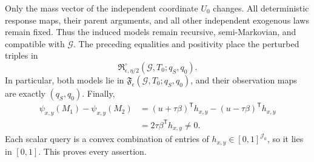 Only the mass vector of the independent coordinate \(U_0\) changes. All deterministic response maps, their parent arguments, and all other independent exogenous laws remain fixed. Thus the induced models remain recursive, semi-Markovian, and compatible with \(\mathcal G\). The preceding equalities and positivity place the perturbed triples in
\[
 \mathfrak R_{\epsilon,\eta/2}^{\circ}(\mathcal G,T_0;q_S,q_0).
\]
In particular, both models lie in \(\mathfrak F_\epsilon(\mathcal G,T_0;q_S,q_0)\), and their observation maps are exactly \((q_S,q_0)\). Finally,
\[
 \begin{aligned}
 \psi_{x,y}(M_1)-\psi_{x,y}(M_2)
 &=(u+\tau\beta)^{\mathsf T}h_{x,y}-(u-\tau\beta)^{\mathsf T}h_{x,y}\\
 &=2\tau\beta^{\mathsf T}h_{x,y}\ne0.
 \end{aligned}
\]
Each scalar query is a convex combination of entries of \(h_{x,y}\in[0,1]^{\mathcal J_0}\), so it lies in \([0,1]\). This proves every assertion.